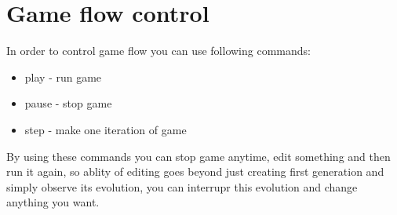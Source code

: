 \chapter*{Game flow control}

In order to control game flow you can use following commands:

\begin{itemize}
	\item \textsf{play} - run game
	\item \textsf{pause} - stop game
	\item \textsf{step} - make one iteration of game
\end{itemize}

By using these commands you can stop game anytime, edit something and then run it again, so ablity of editing goes beyond just creating first generation and simply observe its evolution, you can interrupr this evolution and change anything you want.
